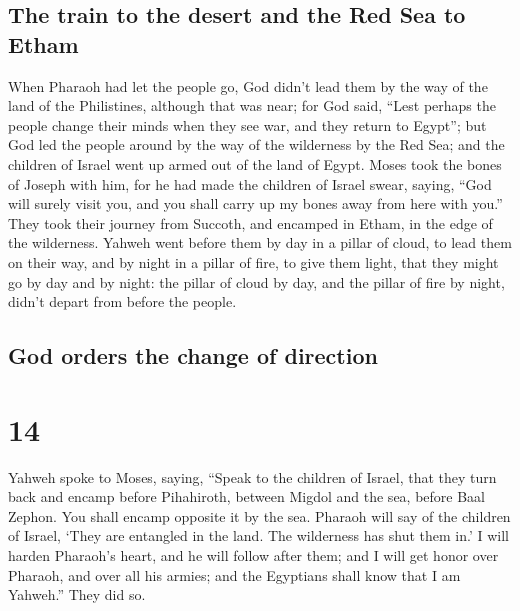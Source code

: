 \hypertarget{the-train-to-the-desert-and-the-red-sea-to-etham}{%
\subsection{The train to the desert and the Red Sea to
Etham}\label{the-train-to-the-desert-and-the-red-sea-to-etham}}

 When Pharaoh had let the people go, God didn't lead them
by the way of the land of the Philistines, although that was near; for
God said, ``Lest perhaps the people change their minds when they see
war, and they return to Egypt'';  but God led the people
around by the way of the wilderness by the Red Sea; and the children of
Israel went up armed out of the land of Egypt.  Moses
took the bones of Joseph with him, for he had made the children of
Israel swear, saying, ``God will surely visit you, and you shall carry
up my bones away from here with you.''  They took their
journey from Succoth, and encamped in Etham, in the edge of the
wilderness.  Yahweh went before them by day in a pillar
of cloud, to lead them on their way, and by night in a pillar of fire,
to give them light, that they might go by day and by night:
 the pillar of cloud by day, and the pillar of fire by
night, didn't depart from before the people.

\hypertarget{god-orders-the-change-of-direction}{%
\subsection{God orders the change of
direction}\label{god-orders-the-change-of-direction}}

\hypertarget{section-13}{%
\section{14}\label{section-13}}

 Yahweh spoke to Moses, saying,  ``Speak to
the children of Israel, that they turn back and encamp before
Pihahiroth, between Migdol and the sea, before Baal Zephon. You shall
encamp opposite it by the sea.  Pharaoh will say of the
children of Israel, `They are entangled in the land. The wilderness has
shut them in.'  I will harden Pharaoh's heart, and he will
follow after them; and I will get honor over Pharaoh, and over all his
armies; and the Egyptians shall know that I am Yahweh.'' They did so.

